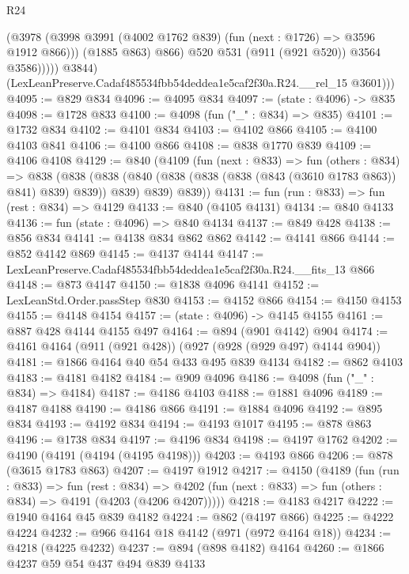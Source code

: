 \begin{lexlean}{R24}
\begin{coremodule}
                      (@3978
                        (@3998 @3991 (@4002 @1762 @839) (fun (next : @1726) => @3596 @1912 @866)))
                      (@1885 @863)
                      @866)
                    @520
                    @531
                    (@911 (@921 @520))
                    @3564
                    @3586)))))
          @3844)
        (LexLeanPreserve.Cadaf485534fbb54deddea1e5caf2f30a.R24.__rel_15 @3601)))
@4095 := @829 @834
@4096 := @4095 @834
@4097 := (state : @4096) -> @835
@4098 := @1728 @833
@4100 := @4098 (fun ("_" : @834) => @835)
@4101 := @1732 @834
@4102 := @4101 @834
@4103 := @4102 @866
@4105 := @4100 @4103 @841
@4106 := @4100 @866
@4108 := @838 @1770 @839
@4109 := @4106 @4108
@4129 := @840
    (@4109
      (fun (next : @833) =>
      fun (others : @834) =>
      @838
        (@838 (@838 (@840 (@838 (@838 (@838 (@843 (@3610 @1783 @863)) @841) @839) @839)) @839) @839)
        @839))
@4131 := fun (run : @833) => fun (rest : @834) => @4129
@4133 := @840 (@4105 @4131)
@4134 := @840 @4133
@4136 := fun (state : @4096) => @840 @4134
@4137 := @849 @428
@4138 := @856 @834
@4141 := @4138 @834 @862 @862
@4142 := @4141 @866
@4144 := @852 @4142 @869
@4145 := @4137 @4144
@4147 := LexLeanPreserve.Cadaf485534fbb54deddea1e5caf2f30a.R24.__fits_13 @866
@4148 := @873 @4147
@4150 := @1838 @4096 @4141
@4152 := LexLeanStd.Order.passStep @830
@4153 := @4152 @866
@4154 := @4150 @4153
@4155 := @4148 @4154
@4157 := (state : @4096) -> @4145 @4155
@4161 := @887 @428 @4144 @4155 @497
@4164 := @894 (@901 @4142) @904
@4174 := @4161 @4164 (@911 (@921 @428)) (@927 (@928 (@929 @497) @4144 @904))
@4181 := @1866 @4164 @40 @54 @433 @495 @839 @4134
@4182 := @862 @4103
@4183 := @4181 @4182
@4184 := @909 @4096
@4186 := @4098 (fun ("_" : @834) => @4184)
@4187 := @4186 @4103
@4188 := @1881 @4096
@4189 := @4187 @4188
@4190 := @4186 @866
@4191 := @1884 @4096
@4192 := @895 @834
@4193 := @4192 @834
@4194 := @4193 @1017
@4195 := @878 @863
@4196 := @1738 @834
@4197 := @4196 @834
@4198 := @4197 @1762
@4202 := @4190 (@4191 (@4194 (@4195 @4198)))
@4203 := @4193 @866
@4206 := @878 (@3615 @1783 @863)
@4207 := @4197 @1912
@4217 := @4150
    (@4189
      (fun (run : @833) =>
      fun (rest : @834) =>
      @4202 (fun (next : @833) => fun (others : @834) => @4191 (@4203 (@4206 @4207)))))
@4218 := @4183 @4217
@4222 := @1940 @4164 @45 @839 @4182
@4224 := @862 (@4197 @866)
@4225 := @4222 @4224
@4232 := @966 @4164 @18 @4142 (@971 (@972 @4164 @18))
@4234 := @4218 (@4225 @4232)
@4237 := @894 (@898 @4182) @4164
@4260 := @1866
    @4237
    @59
    @54
    @437
    @494
    @839
    @4133

\end{coremodule}
\end{lexlean}
